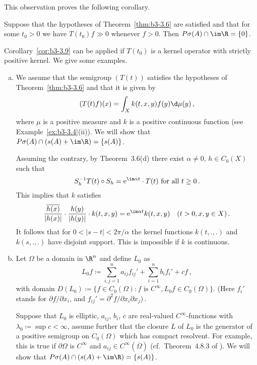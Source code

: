 This observation proves the following corollary.
\begin{corollary}\label{cor:b3-3.9}
	Suppose that the hypotheses of Theorem~\ref{thm:b3-3.6} are satisfied and that for some $t_{0} > 0$ we have $T(t_{0})f \gg 0$ whenever $f > 0$.
	Then $P\sigma(A)\cap \im\R = \{0\}$.
\end{corollary}
Corollary~\ref{cor:b3-3.9} can be applied if $T(t_{0})$ is a kernel operator with strictly positive kernel.
We give some examples.
%
\begin{examples}\label{ex:b3-3.10}
	
	\begin{enumerate}[(a), wide] 
	\item 
	We assume that the semigroup $(T(t))$ satisfies the hypotheses of Theorem~\ref{thm:b3-3.6} and that it is given by
	\[
	(T(t)f)(x) = \int_{X} k(t,x,y)f(y) \d\mu(y)\,,
	\]
	where $\mu$ is a positive measure and $k$ is a positive continuous function (see Example~\ref{ex:b3-3.4}(ii)).
	We will show that $P\sigma(A)\cap(s(A) + \im\R) = \{s(A)\}$.
	
	Assuming the contrary, by Theorem~3.6(d) there exist $\alpha \neq 0$, $h \in C_{0}(X)$ such that
	\begin{equation}\label{eq:b3-3.10}
	S_{h}^{-1}T(t)\circ S_{h} = \mathrm{e}^{\im\alpha t}\cdot T(t) \text{ for all } t \geq 0\,.
	\end{equation}
	This implies that $k$ satisfies
	\begin{equation}\label{eq:b3-3.11}
	\frac{\overline{h(x)}}{|h(x)|}\cdot\frac{h(y)}{|h(y)|}\cdot k(t,x,y) = \mathrm{e}^{\im\alpha t}k(t,x,y) \quad (t > 0, x,y \in X)\,.
	\end{equation}
	It follows that for $0 < |s-t| < 2\pi/\alpha$ the kernel functions  $k(t,.,.)$ and $k(s,.,.)$ have disjoint support.
	This is impossible if $k$ is continuous.
	
	\item 
	Let $\Omega$ be a domain in $\R^{n}$ and define $L_{0}$ as
	\[
	L_{0}f \coloneq \sum_{i,j=1}^{n} a_{ij}f_{ij}' + \sum_{i=1}^{n}b_{i}f_{i}' + cf\,,
	\]
	with domain $D(L_{0}) \coloneq \{f \in C_{0}(\Omega) : f \text{ is } C^{\infty}, L_{0}f \in C_{0}(\Omega)\}$.
	(Here $f_{i}'$ stands for $\partial f/\partial x_{i}$, and $f_{ij}' = \partial^{2}f/\partial x_{i}\partial x_{j}$)\,.
	
	Suppose that $L_{0}$ is elliptic, $a_{ij}$, $b_{i}$, $c$ are real-valued $C^{\infty}$-functions with $\lambda_{0} \coloneq \sup c < \infty$, assume further that the closure $L$ of $L_{0}$ is the generator of a positive semigroup on $C_{0}(\Omega)$ which has compact resolvent.
	For example, this is true if $\partial\Omega$ is $C^{\infty}$ and $a_{ij} \in C^{\infty}(\overline{\Omega})$ (cf.\ Theorem~4.8.3 of \citet{fattorini:1983}).
	We will show that $P\sigma(A)\cap(s(A) + \im\R) = \{s(A)\}$.
	

\end{enumerate}
\end{examples}
